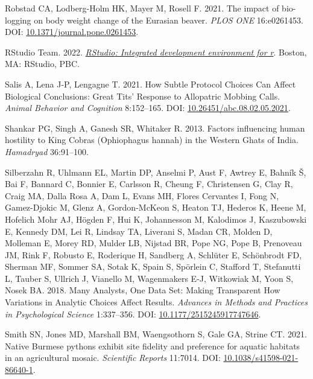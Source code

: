 \documentclass[10pt,a4paper]{article}
\newlength{\cslhangindent}
\newenvironment{CSLReferences}[2] %
 {\begin{list}{}{%
  \setlength{\itemindent}{0pt}
  \setlength{\leftmargin}{0pt}
  \setlength{\parsep}{0pt}
  \ifodd #1
   \setlength{\leftmargin}{\cslhangindent}
   \setlength{\itemindent}{-1\cslhangindent}
  \fi
  \setlength{\itemsep}{#2\baselineskip}}}
 {\end{list}}
\begin{document}
\begin{CSLReferences}{1}{0}
Robstad CA, Lodberg-Holm HK, Mayer M, Rosell F. 2021. The impact of bio-logging on body weight change of the {Eurasian} beaver. \emph{PLOS ONE} 16:e0261453. DOI: \href{https://doi.org/10.1371/journal.pone.0261453}{10.1371/journal.pone.0261453}.

RStudio Team. 2022. \emph{\href{http://www.rstudio.com/}{{RStudio}: Integrated development environment for r}}. Boston, MA: RStudio, PBC.

Salis A, Lena J-P, Lengagne T. 2021. How {Subtle} {Protocol} {Choices} {Can} {Affect} {Biological} {Conclusions}: {Great} {Tits}' {Response} to {Allopatric} {Mobbing} {Calls}. \emph{Animal Behavior and Cognition} 8:152--165. DOI: \href{https://doi.org/10.26451/abc.08.02.05.2021}{10.26451/abc.08.02.05.2021}.

Shankar PG, Singh A, Ganesh SR, Whitaker R. 2013. Factors influencing human hostility to {King} {Cobras} ({Ophiophagus} hannah) in the {Western} {Ghats} of {India}. \emph{Hamadryad} 36:91--100.

Silberzahn R, Uhlmann EL, Martin DP, Anselmi P, Aust F, Awtrey E, Bahník Š, Bai F, Bannard C, Bonnier E, Carlsson R, Cheung F, Christensen G, Clay R, Craig MA, Dalla Rosa A, Dam L, Evans MH, Flores Cervantes I, Fong N, Gamez-Djokic M, Glenz A, Gordon-McKeon S, Heaton TJ, Hederos K, Heene M, Hofelich Mohr AJ, Högden F, Hui K, Johannesson M, Kalodimos J, Kaszubowski E, Kennedy DM, Lei R, Lindsay TA, Liverani S, Madan CR, Molden D, Molleman E, Morey RD, Mulder LB, Nijstad BR, Pope NG, Pope B, Prenoveau JM, Rink F, Robusto E, Roderique H, Sandberg A, Schlüter E, Schönbrodt FD, Sherman MF, Sommer SA, Sotak K, Spain S, Spörlein C, Stafford T, Stefanutti L, Tauber S, Ullrich J, Vianello M, Wagenmakers E-J, Witkowiak M, Yoon S, Nosek BA. 2018. Many {Analysts}, {One} {Data} {Set}: {Making} {Transparent} {How} {Variations} in {Analytic} {Choices} {Affect} {Results}. \emph{Advances in Methods and Practices in Psychological Science} 1:337--356. DOI: \href{https://doi.org/10.1177/2515245917747646}{10.1177/2515245917747646}.

Smith SN, Jones MD, Marshall BM, Waengsothorn S, Gale GA, Strine CT. 2021. Native {Burmese} pythons exhibit site fidelity and preference for aquatic habitats in an agricultural mosaic. \emph{Scientific Reports} 11:7014. DOI: \href{https://doi.org/10.1038/s41598-021-86640-1}{10.1038/s41598-021-86640-1}.


\end{CSLReferences}
\end{document}
